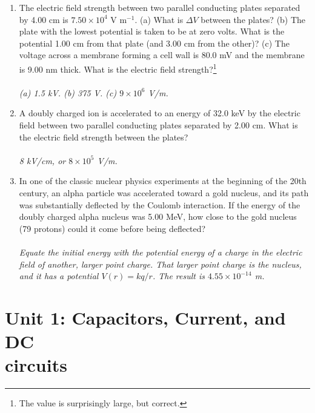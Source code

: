 \documentclass[12pt,twocolumn]{article}
\begin{document}
\begin{enumerate}
\item The electric field strength between two parallel conducting plates separated by 4.00 cm is $7.50 \times 10^4$ V m$^{-1}$. (a) What is $\Delta V$ between the plates? (b) The plate with the lowest potential is taken to be at zero volts. What is the potential 1.00 cm from that plate (and 3.00 cm from the other)? (c) The voltage across a membrane forming a cell wall is 80.0 mV and the membrane is 9.00 nm thick. What is the electric field strength?\footnote{The value is surprisingly large, but correct.} \\ \\
\textit{(a) 1.5 kV. (b) 375 V. (c) $9\times 10^6$ V/m.}
\item A doubly charged ion is accelerated to an energy of 32.0 keV by the electric field between two parallel conducting plates separated by 2.00 cm. What is the electric field strength between the plates? \\ \\
\textit{8 kV/cm, or $8\times 10^5$ V/m.}
\item In one of the classic nuclear physics experiments at the beginning of the 20th century, an alpha particle was accelerated toward a gold nucleus, and its path was substantially deflected by the Coulomb interaction. If the energy of the doubly charged alpha nucleus was 5.00 MeV, how close to the gold nucleus (79 protons) could it come before being deflected? \\ \\
\textit{Equate the initial energy with the potential energy of a charge in the electric field of another, larger point charge.  That larger point charge is the nucleus, and it has a potential $V(r) = kq/r$.  The result is $4.55\times 10^{-14}$ m.}
\end{enumerate}

\section{Unit 1: Capacitors, Current, and DC \\ circuits}
\end{document}
